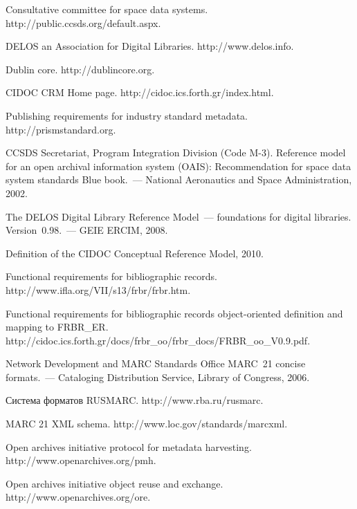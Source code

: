 \begin{multicols}{2}
{{\begin{thebibliography}{99}
Consultative committee for space data systems. {\sf http://public.ccsds.org/default.aspx}.

DELOS an Association for Digital Libraries. {\sf http://\linebreak  www.delos.info}.

Dublin core. {\sf http://dublincore.org}.

CIDOC CRM Home page. {\sf http://cidoc.ics.forth.gr/\linebreak index.html}.

Publishing requirements for industry standard metadata. {\sf http://prismstandard.org}.

CCSDS Secretariat, Program Integration Division (Code M-3). Reference model for an open 
archival information system (OAIS): Recommendation for space data system standards Blue 
book.~--- National Aeronautics and Space Administration, 2002.

The DELOS Digital Library Reference Model~--- foundations for digital libraries. 
Version~0.98.~--- GEIE ERCIM, 2008.

Definition of the CIDOC Conceptual Reference Model, 2010.

Functional requirements for bibliographic records. {\sf http://www.ifla.org/VII/s13/frbr/frbr.htm}.

Functional requirements for bibliographic records object-oriented definition and mapping to 
FRBR\_ER. {\sf http://cidoc.ics.forth.gr/docs/frbr\_oo/frbr\_docs/\linebreak FRBR\_oo\_V0.9.pdf}.

Network Development and MARC Standards Office MARC~21 concise formats.~--- Cataloging 
Distribution Service, Library of Congress, 2006.

Система форматов RUSMARC. {\sf http://www.rba.ru/\linebreak rusmarc}.

MARC 21 XML schema. {\sf http://www.loc.gov/\linebreak standards/marcxml}.

Open archives initiative protocol for metadata harvesting. {\sf http://www.openarchives.org/pmh}.

Open archives initiative object reuse and exchange. {\sf http://www.openarchives.org/ore}.


\end{thebibliography}}}
\end{multicols}
